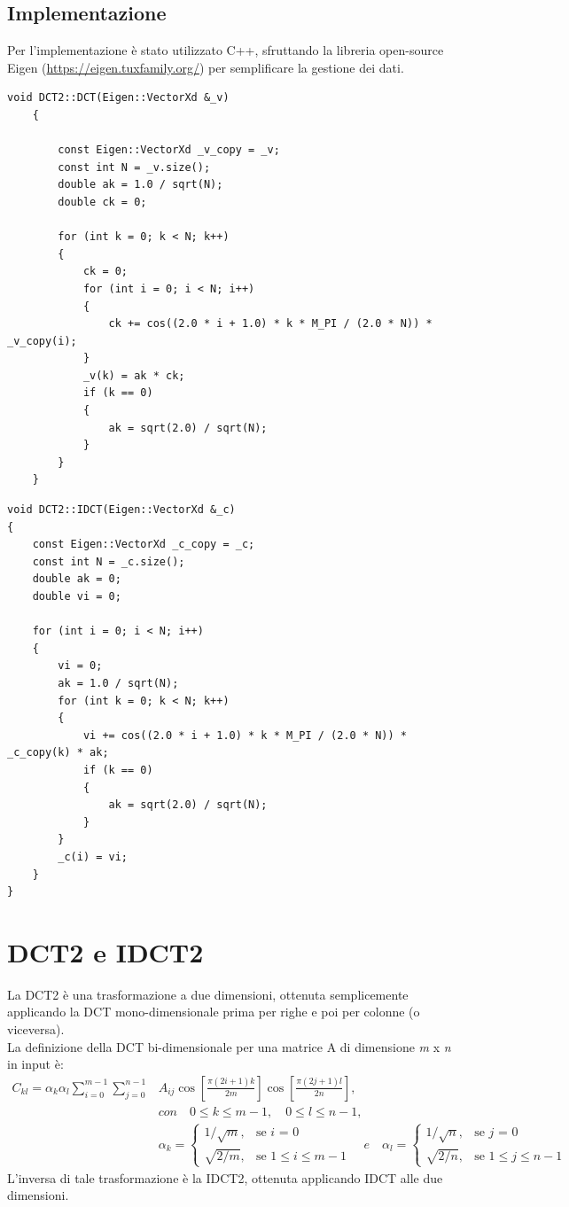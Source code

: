 \documentclass[a4paper,12pt]{report}
\begin{document}
\subsection*{Implementazione}
Per l'implementazione è stato utilizzato C++, sfruttando la libreria open-source Eigen (\url{https://eigen.tuxfamily.org/}) per semplificare la gestione dei dati.\\
\begin{lstlisting}[caption={Funzione di calcolo DCT},captionpos=b]
	void DCT2::DCT(Eigen::VectorXd &_v)
	{
	
		const Eigen::VectorXd _v_copy = _v;
		const int N = _v.size();
		double ak = 1.0 / sqrt(N);
		double ck = 0;
	
		for (int k = 0; k < N; k++)
		{
			ck = 0;
			for (int i = 0; i < N; i++)
			{
				ck += cos((2.0 * i + 1.0) * k * M_PI / (2.0 * N)) * _v_copy(i);
			}
			_v(k) = ak * ck;
			if (k == 0)
			{
				ak = sqrt(2.0) / sqrt(N);
			}
		}
	}
\end{lstlisting}
\hfill \break
\begin{lstlisting}[caption={Funzione di calcolo IDCT},captionpos=b]
void DCT2::IDCT(Eigen::VectorXd &_c)
{
    const Eigen::VectorXd _c_copy = _c;
    const int N = _c.size();
    double ak = 0;
    double vi = 0;

    for (int i = 0; i < N; i++)
    {
        vi = 0;
        ak = 1.0 / sqrt(N);
        for (int k = 0; k < N; k++)
        {
            vi += cos((2.0 * i + 1.0) * k * M_PI / (2.0 * N)) * _c_copy(k) * ak;
            if (k == 0)
            {
                ak = sqrt(2.0) / sqrt(N);
            }
        }
        _c(i) = vi;
    }
}
\end{lstlisting}

\section{DCT2 e IDCT2}
La DCT2 è una trasformazione a due dimensioni, ottenuta semplicemente applicando la DCT mono-dimensionale prima per righe e poi per colonne (o viceversa).\\
La definizione della DCT bi-dimensionale per una matrice A di dimensione \textit{m} x \textit{n} in input è:\\
\begin{align*}
C_{kl} = \alpha_k \alpha_l \sum_{i=0}^{m-1} \sum_{j=0}^{n-1}&A_{ij} \cos \left[\frac{\pi \left(2i + 1\right) k }{2m}\right] \cos \left[\frac{\pi \left(2j + 1\right) l }{2n}\right],\\
&con \quad 0 \leq k \leq m - 1, \quad 0 \leq l \leq n - 1,\\
&\alpha_k = \begin{cases} 1/\sqrt{m}, & \mbox{se } i\mbox{ = 0} \\ \sqrt{2/m}, & \mbox{se } \mbox{\(1 \leq i \leq m - 1\)} \end{cases} \quad e \quad \alpha_l = \begin{cases} 1/\sqrt{n}, & \mbox{se } j\mbox{ = 0} \\ \sqrt{2/n}, & \mbox{se } \mbox{\(1 \leq j \leq n - 1\)} \end{cases}
\end{align*}
L'inversa di tale trasformazione è la IDCT2, ottenuta applicando IDCT alle due dimensioni.
\end{document}
